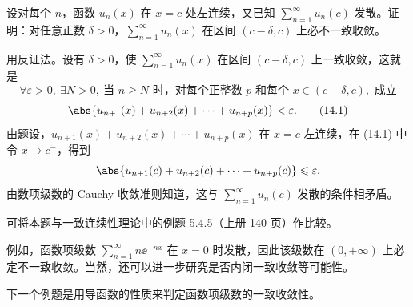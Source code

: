 \begin{xexample}[14.1.3]
设对每个 $n$，函数 $u_n(x)$ 在 $x=c$ 处左连续，又已知 $\displaystyle\sum_{n=1}^{\infty}u_n(c)$ 发散。证明：对任意正数 $\delta>0$，$\displaystyle\sum_{n=1}^{\infty}u_n(x)$ 在区间 $(c-\delta,c)$ 上必不一致收敛。
\end{xexample}
\begin{xproof}
用反证法。设有 $\delta>0$，使 $\displaystyle\sum_{n=1}^{\infty}u_n(x)$ 在区间 $(c-\delta,c)$ 上一致收敛，这就是
\[
  \forall\varepsilon>0,\ \exists N>0,\ \text{当 }n\geqslant N\text{ 时，对每个正整数 }p\text{ 和每个 }x\in(c-\delta,c),\text{ 成立}
\]
\begin{equation}
  \abs{u_{n+1}(x)+u_{n+2}(x)+\cdots+u_{n+p}(x)}<\varepsilon.
  \tag{14.1}
  \label{eq:14.1}
\end{equation}
由题设，$u_{n+1}(x)+u_{n+2}(x)+\cdots+u_{n+p}(x)$ 在 $x=c$ 左连续，在 (14.1) 中令 $x\to c^-$，得到
\[
  \abs{u_{n+1}(c)+u_{n+2}(c)+\cdots+u_{n+p}(c)}\leqslant\varepsilon.
\]
由数项级数的 Cauchy 收敛准则知道，这与 $\displaystyle\sum_{n=1}^{\infty}u_n(c)$ 发散的条件相矛盾。
\end{xproof}

\begin{xremark}
可将本题与一致连续性理论中的例题 5.4.5（上册 140 页）作比较。
\end{xremark}

\begin{xremark}
例如，函数项级数 $\displaystyle\sum_{n=1}^{\infty}n\ee^{-nx}$ 在 $x=0$ 时发散，因此该级数在 $(0,+\infty)$ 上必定不一致收敛。当然，还可以进一步研究是否内闭一致收敛等可能性。
\end{xremark}

下一个例题是用导函数的性质来判定函数项级数的一致收敛性。

